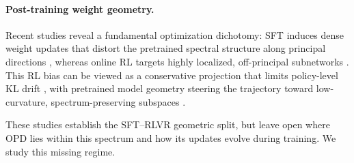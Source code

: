 \documentclass{llmxive}
\begin{document}
\paragraph{Post-training weight geometry.}
Recent studies reveal a fundamental 
optimization dichotomy: SFT induces dense weight updates that distort the 
pretrained spectral structure along principal directions 
\cite{liu2026liftveiltruthprincipal}, whereas online RL targets highly localized, 
off-principal subnetworks 
\cite{mukherjee2025reinforcementlearningfinetunessmall}. This RL bias can be 
viewed as a conservative projection that limits policy-level KL drift 
\cite{shenfeld2025rlsrazoronlinereinforcement, wu2026invisibleleashrlvrescape}, 
with pretrained model geometry steering the trajectory toward low-curvature, 
spectrum-preserving subspaces \cite{zhu2025pnt}.

These studies establish the SFT--RLVR geometric split, but leave open where
OPD lies within this spectrum and how its updates evolve during training.
We study this missing regime.
\end{document}
